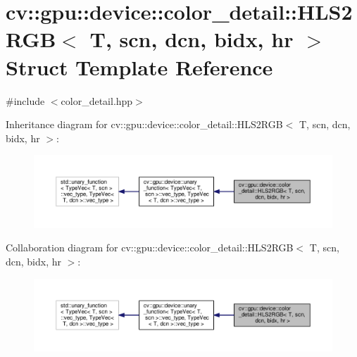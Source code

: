 \hypertarget{structcv_1_1gpu_1_1device_1_1color__detail_1_1HLS2RGB}{\section{cv\-:\-:gpu\-:\-:device\-:\-:color\-\_\-detail\-:\-:H\-L\-S2\-R\-G\-B$<$ T, scn, dcn, bidx, hr $>$ Struct Template Reference}
\label{structcv_1_1gpu_1_1device_1_1color__detail_1_1HLS2RGB}
}


{\ttfamily \#include $<$color\-\_\-detail.\-hpp$>$}



Inheritance diagram for cv\-:\-:gpu\-:\-:device\-:\-:color\-\_\-detail\-:\-:H\-L\-S2\-R\-G\-B$<$ T, scn, dcn, bidx, hr $>$\-:\nopagebreak
\begin{figure}[H]
\begin{center}
\leavevmode
\includegraphics[width=350pt]{structcv_1_1gpu_1_1device_1_1color__detail_1_1HLS2RGB__inherit__graph}
\end{center}
\end{figure}


Collaboration diagram for cv\-:\-:gpu\-:\-:device\-:\-:color\-\_\-detail\-:\-:H\-L\-S2\-R\-G\-B$<$ T, scn, dcn, bidx, hr $>$\-:\nopagebreak
\begin{figure}[H]
\begin{center}
\leavevmode
\includegraphics[width=350pt]{structcv_1_1gpu_1_1device_1_1color__detail_1_1HLS2RGB__coll__graph}
\end{center}
\end{figure}
